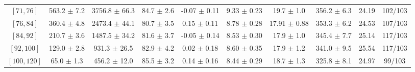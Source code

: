 \begin{tabular}{c||c|c|c|c|c|c|c||c|c}
$[71, 76]$ & 563.2 $\pm$ 7.2 & 3756.8 $\pm$ 66.3 & 84.7 $\pm$ 2.6 & -0.07 $\pm$ 0.11 & 9.33 $\pm$ 0.23 & 19.7 $\pm$ 1.0 & 356.2 $\pm$ 6.3 & 24.19 & 102/103\\
$[76, 84]$ & 360.4 $\pm$ 4.8 & 2473.4 $\pm$ 44.1 & 80.7 $\pm$ 3.5 & 0.15 $\pm$ 0.11 & 8.78 $\pm$ 0.28 & 17.91 $\pm$ 0.88 & 353.3 $\pm$ 6.2 & 24.53 & 107/103\\
$[84, 92]$ & 210.7 $\pm$ 3.6 & 1487.5 $\pm$ 34.2 & 81.6 $\pm$ 3.7 & -0.05 $\pm$ 0.14 & 8.53 $\pm$ 0.30 & 17.9 $\pm$ 1.0 & 345.4 $\pm$ 7.7 & 25.14 & 117/103\\
$[92, 100]$ & 129.0 $\pm$ 2.8 & 931.3 $\pm$ 26.5 & 82.9 $\pm$ 4.2 & 0.02 $\pm$ 0.18 & 8.60 $\pm$ 0.35 & 17.9 $\pm$ 1.2 & 341.0 $\pm$ 9.5 & 25.54 & 117/103\\
$[100, 120]$ & 65.0 $\pm$ 1.3 & 456.2 $\pm$ 12.0 & 85.5 $\pm$ 3.2 & 0.14 $\pm$ 0.16 & 8.44 $\pm$ 0.29 & 18.7 $\pm$ 1.3 & 325.8 $\pm$ 8.1 & 24.97 & 99/103\\
\end{tabular}
